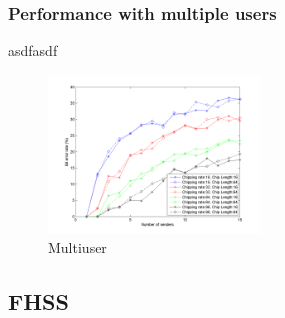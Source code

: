 		\subsubsection{Performance with multiple users}
		asdfasdf
		\begin{figure}[H]
			\includegraphics[width=0.5\textwidth]{imgs/results/plot_mode_dsss-test_numSenders-rep_20-dataRate_8-dataLength_128.png}
			\caption{Multiuser}
			\label{fig:dsss_multiuser}
		\end{figure}
		
		
	
	\subsection{FHSS}
	
